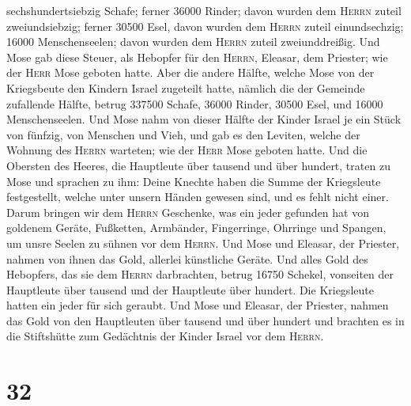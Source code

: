 sechshundertsiebzig Schafe;  ferner 36000 Rinder; davon
wurden dem \textsc{Herrn} zuteil zweiundsiebzig;  ferner
30500 Esel, davon wurden dem \textsc{Herrn} zuteil einundsechzig;
 16000 Menschenseelen; davon wurden dem \textsc{Herrn}
zuteil zweiunddreißig.  Und Mose gab diese Steuer, als
Hebopfer für den \textsc{Herrn}, Eleasar, dem Priester; wie der
\textsc{Herr} Mose geboten hatte.  Aber die andere
Hälfte, welche Mose von der Kriegsbeute den Kindern Israel zugeteilt
hatte,  nämlich die der Gemeinde zufallende Hälfte,
betrug 337500 Schafe,  36000 Rinder, 
30500 Esel,  und 16000 Menschenseelen. 
Und Mose nahm von dieser Hälfte der Kinder Israel je ein Stück von
fünfzig, von Menschen und Vieh, und gab es den Leviten, welche der
Wohnung des \textsc{Herrn} warteten; wie der \textsc{Herr} Mose geboten
hatte.  Und die Obersten des Heeres, die Hauptleute über
tausend und über hundert,  traten zu Mose und sprachen zu
ihm: Deine Knechte haben die Summe der Kriegsleute festgestellt, welche
unter unsern Händen gewesen sind, und es fehlt nicht einer.
 Darum bringen wir dem \textsc{Herrn} Geschenke, was ein
jeder gefunden hat von goldenem Geräte, Fußketten, Armbänder,
Fingerringe, Ohrringe und Spangen, um unsre Seelen zu sühnen vor dem
\textsc{Herrn}.  Und Mose und Eleasar, der Priester,
nahmen von ihnen das Gold, allerlei künstliche Geräte. 
Und alles Gold des Hebopfers, das sie dem \textsc{Herrn} darbrachten,
betrug 16750 Schekel, vonseiten der Hauptleute über tausend und der
Hauptleute über hundert.  Die Kriegsleute hatten ein
jeder für sich geraubt.  Und Mose und Eleasar, der
Priester, nahmen das Gold von den Hauptleuten über tausend und über
hundert und brachten es in die Stiftshütte zum Gedächtnis der Kinder
Israel vor dem \textsc{Herrn}.

\hypertarget{section-31}{%
\section{32}\label{section-31}}

